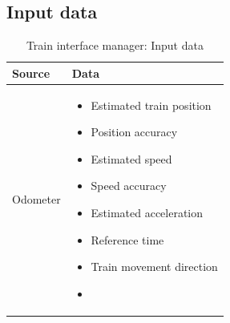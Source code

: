 \documentclass[nocc]{template/openetcs_report}
\begin{document}
\subsection{Input data}
			\begin{longtable}{|l|l|}
				\caption{Train interface manager: Input data}\\ 
				\hline
				
					\begin{minipage}[t]{0.35\linewidth} \textbf{Source}	\end{minipage} 
				&	\begin{minipage}[t]{0.65\linewidth} \textbf{Data} \end{minipage} \\
				
				\hline
																																									
					\begin{minipage}[t]{0.35\linewidth} Odometer	\end{minipage} 
				&	\begin{minipage}[t]{0.65\linewidth}
						\begin{itemize}
							\item Estimated train position
							\item Position accuracy
							\item Estimated speed
							\item Speed accuracy
							\item Estimated acceleration
							\item Reference time
							\item Train movement direction
							\item 
						\end{itemize}
					\end{minipage} \\
				
				\hline
				

\end{longtable}
\end{document}
